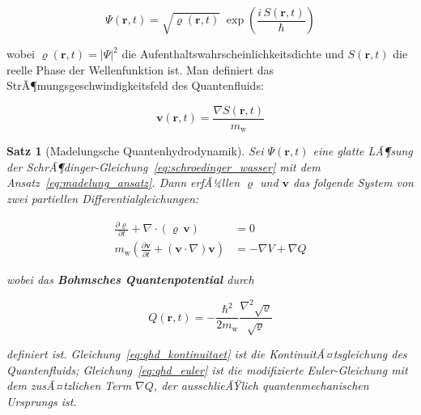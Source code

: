 ﻿\documentclass[12pt,a4paper]{report}
\newtheorem{theorem}{Satz}[chapter]
\begin{document}
\begin{equation}
	\Psi(\mathbf{r},t) = \sqrt{\varrho(\mathbf{r},t)}\;\exp\!\left(\frac{i\,S(\mathbf{r},t)}{\hbar}\right)
	\label{eq:madelung_ansatz}
\end{equation}

wobei $\varrho(\mathbf{r},t) = |\Psi|^2$ die Aufenthaltswahrscheinlichkeitsdichte und $S(\mathbf{r},t)$ die reelle Phase der Wellenfunktion ist. Man definiert das StrÃ¶mungsgeschwindigkeitsfeld des Quantenfluids:

\begin{equation}
	\mathbf{v}(\mathbf{r},t) = \frac{\nabla S(\mathbf{r},t)}{m_\mathrm{w}}
	\label{eq:geschwindigkeit_phase}
\end{equation}

\begin{theorem}[Madelungsche Quantenhydrodynamik]
	\label{thm:madelung}
	Sei $\Psi(\mathbf{r},t)$ eine glatte LÃ¶sung der SchrÃ¶dinger-Gleichung~\eqref{eq:schroedinger_wasser} mit dem Ansatz~\eqref{eq:madelung_ansatz}. Dann erfÃ¼llen $\varrho$ und $\mathbf{v}$ das folgende System von zwei partiellen Differentialgleichungen:
	
	\begin{align}
		\frac{\partial \varrho}{\partial t} + \nabla \cdot (\varrho\,\mathbf{v}) &= 0 \label{eq:qhd_kontinuitaet}\\[6pt]
		m_\mathrm{w}\left(\frac{\partial \mathbf{v}}{\partial t} + (\mathbf{v}\cdot\nabla)\mathbf{v}\right) &= -\nabla V + \nabla Q \label{eq:qhd_euler}
	\end{align}
	
	wobei das \textbf{Bohmsches Quantenpotential} durch
	
	\begin{equation}
		Q(\mathbf{r},t) = -\frac{\hbar^2}{2m_\mathrm{w}} \frac{\nabla^2\sqrt{\varrho}}{\sqrt{\varrho}}
		\label{eq:quantenpotential}
	\end{equation}
	
	definiert ist. Gleichung~\eqref{eq:qhd_kontinuitaet} ist die KontinuitÃ¤tsgleichung des Quantenfluids; Gleichung~\eqref{eq:qhd_euler} ist die modifizierte Euler-Gleichung mit dem zusÃ¤tzlichen Term $\nabla Q$, der ausschlieÃŸlich quantenmechanischen Ursprungs ist.
\end{theorem}
\end{document}
